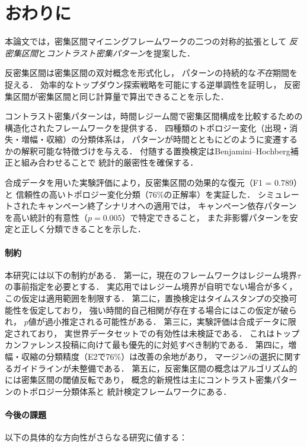 \section{おわりに}\label{sec:conclusion}

本論文では，密集区間マイニングフレームワークの二つの対称的拡張として
\emph{反密集区間}と\emph{コントラスト密集パターン}を提案した．

反密集区間は密集区間の双対概念を形式化し，
パターンの持続的な\emph{不在}期間を捉える．
効率的なトップダウン探索戦略を可能にする逆単調性を証明し，
反密集区間が密集区間と同じ計算量で算出できることを示した．

コントラスト密集パターンは，時間レジーム間で密集区間構成を比較するための
構造化されたフレームワークを提供する．
四種類のトポロジー変化（出現・消失・増幅・収縮）の分類体系は，
パターンが時間とともにどのように変遷するかの解釈可能な特徴づけを与える．
付随する置換検定はBenjamini--Hochberg補正と組み合わせることで
統計的厳密性を確保する．

合成データを用いた実験評価により，反密集区間の効果的な復元（F1 = 0.789）と
信頼性の高いトポロジー変化分類（76\%の正解率）を実証した．
シミュレートされたキャンペーン終了シナリオへの適用では，
キャンペーン依存パターンを高い統計的有意性（$p = 0.005$）で特定できること，
また非影響パターンを安定と正しく分類できることを示した．

\paragraph{制約}
本研究には以下の制約がある．
第一に，現在のフレームワークはレジーム境界$\tau$の事前指定を必要とする．
実応用ではレジーム境界が自明でない場合が多く，
この仮定は適用範囲を制限する．
第二に，置換検定はタイムスタンプの交換可能性を仮定しており，
強い時間的自己相関が存在する場合にはこの仮定が破られ，
$p$値が過小推定される可能性がある．
第三に，実験評価は合成データに限定されており，
実世界データセットでの有効性は未検証である．
これはトップカンファレンス投稿に向けて最も優先的に対処すべき制約である．
第四に，増幅・収縮の分類精度（E2で76\%）は改善の余地があり，
マージン$\delta$の選択に関するガイドラインが未整備である．
第五に，反密集区間の概念はアルゴリズム的には密集区間の閾値反転であり，
概念的新規性は主にコントラスト密集パターンのトポロジー分類体系と
統計検定フレームワークにある．

\paragraph{今後の課題}
以下の具体的な方向性がさらなる研究に値する：

